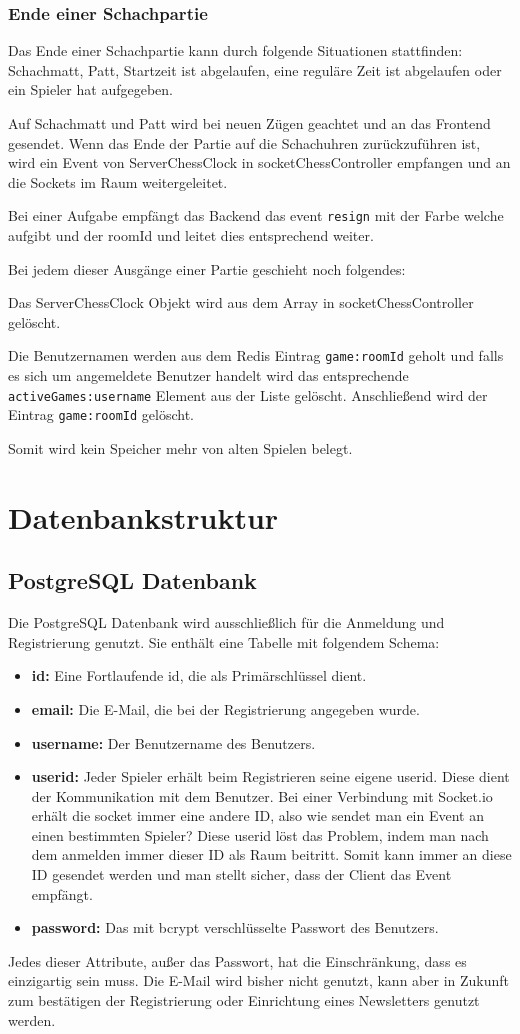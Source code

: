 \subsubsection{Ende einer Schachpartie}
\label{sec:Schach-Ende}
Das Ende einer Schachpartie kann durch folgende Situationen stattfinden:
Schachmatt, Patt, Startzeit ist abgelaufen, eine reguläre Zeit ist abgelaufen oder ein Spieler hat aufgegeben.

Auf Schachmatt und Patt wird bei neuen Zügen geachtet und an das Frontend gesendet. Wenn das Ende der Partie auf die Schachuhren zurückzuführen ist, wird ein Event von ServerChessClock in socketChessController empfangen und an die Sockets im Raum weitergeleitet. 

Bei einer Aufgabe empfängt das Backend das event \verb|resign| mit der Farbe welche aufgibt und der roomId und leitet dies entsprechend weiter.

Bei jedem dieser Ausgänge einer Partie geschieht noch folgendes:

Das ServerChessClock Objekt wird aus dem Array in socketChessController gelöscht.

Die Benutzernamen werden aus dem Redis Eintrag \verb|game:roomId| geholt und falls es sich um angemeldete Benutzer handelt wird das entsprechende \verb|activeGames:username| Element aus der Liste gelöscht. Anschließend wird der Eintrag \verb|game:roomId| gelöscht.

Somit wird kein Speicher mehr von alten Spielen belegt.
		\section{Datenbankstruktur}
\subsection{PostgreSQL Datenbank}
Die PostgreSQL Datenbank wird ausschließlich für die Anmeldung und Registrierung genutzt. Sie enthält eine Tabelle mit folgendem Schema:
\begin{itemize}
\item \textbf{id:} Eine Fortlaufende id, die als Primärschlüssel dient.
\item \textbf{email:} Die E-Mail, die bei der Registrierung angegeben wurde.
\item \textbf{username:} Der Benutzername des Benutzers.
\item \textbf{userid:} Jeder Spieler erhält beim Registrieren seine eigene userid. Diese dient der Kommunikation mit dem Benutzer. Bei einer Verbindung mit Socket.io erhält die socket immer eine andere ID, also wie sendet man ein Event an einen bestimmten Spieler? Diese userid löst das Problem, indem man nach dem anmelden immer dieser ID als Raum beitritt. Somit kann immer an diese ID gesendet werden und man stellt sicher, dass der Client das Event empfängt.
\item \textbf{password:} Das mit bcrypt verschlüsselte Passwort des Benutzers.
\end{itemize}
Jedes dieser Attribute, außer das Passwort, hat die Einschränkung, dass es einzigartig sein muss. Die E-Mail wird bisher nicht genutzt, kann aber in Zukunft zum bestätigen der Registrierung oder Einrichtung eines Newsletters genutzt werden.


